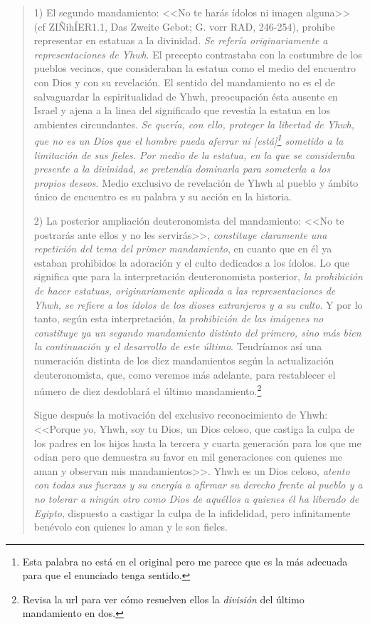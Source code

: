\documentclass{article}
\begin{document}
\begin{quote}
1) El segundo mandamiento: <<No te harás ídolos ni imagen alguna>> (cf ZIÑihÍER1.1, Das Zweite Gebot; G. vorr RAD, 246-254), prohibe representar en estatuas a la divinidad. \emph{Se refería originariamente a representaciones de Yhwh}. El precepto contrastaba con la costumbre de los pueblos vecinos, que consideraban la estatua como el medio del encuentro con Dios y con su revelación. El sentido del mandamiento no es el de salvaguardar la espiritualidad de Yhwh, preocupación ésta ausente en Israel y ajena a la linea del significado que revestía la estatua en los ambientes circundantes. \emph{Se quería, con ello, proteger la libertad de Yhwh, que no es un Dios que el hombre pueda aferrar ni [est\'a]\footnote{Esta palabra no est\'a en el original pero me parece que es la m\'as adecuada para que el enunciado tenga sentido.} sometido a la limitación de sus fieles. Por medio de la estatua, en la que se consideraba presente a la divinidad, se pretendía dominarla para someterla a los propios deseos}. Medio exclusivo de revelación de Yhwh al pueblo y ámbito único de encuentro es su palabra y su acción en la historia.

2) La posterior ampliación deuteronomista del mandamiento: <<No te postrarás ante ellos y no les servirás>>, \emph{constituye claramente una repetición del tema del primer mandamiento}, en cuanto que en él ya estaban prohibidos la adoración y el culto dedicados a los ídolos. Lo que significa que para la interpretación deuteronomista posterior, \emph{la prohibición de hacer estatuas, originariamente aplicada a las representaciones de Yhwh, se refiere a los ídolos de los dioses extranjeros y a su culto}. Y por lo tanto, según esta interpretación, \emph{la prohibición de las imágenes no constituye ya un segundo mandamiento distinto del primero, sino más bien la continuación y el desarrollo de este último}. Tendríamos así una numeración distinta de los diez mandamientos según la actualización deuteronomista, que, como veremos más adelante, para restablecer el número de diez desdoblará el último mandamiento.\footnote{Revisa la url para ver c\'omo resuelven ellos la \emph{divisi\'on} del \'ultimo mandamiento en dos.}

Sigue después la motivación del exclusivo reconocimiento de Yhwh: <<Porque yo, Yhwh, soy tu Dios, un Dios celoso, que castiga la culpa de los padres en los hijos hasta la tercera y cuarta generación para los que me odian pero que demuestra su favor en mil generaciones con quienes me aman y observan mis mandamientos>>. Yhwh es un Dios celoso, \emph{atento con todas sus fuerzas y su energía a afirmar su derecho frente al pueblo y a no tolerar a ningún otro como Dios de aquéllos a quienes él ha liberado de Egipto}, dispuesto a castigar la culpa de la infidelidad, pero infinitamente benévolo con quienes lo aman y le son fieles.
\end{quote}
\end{document}
